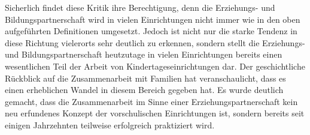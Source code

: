 \documentclass[12pt,a4paper]{article}
\begin{document}
Sicherlich findet diese Kritik ihre Berechtigung, denn die Erziehungs- und Bildungspartnerschaft wird in vielen Einrichtungen nicht immer wie in den oben aufgeführten Definitionen umgesetzt. Jedoch ist nicht nur die starke Tendenz in diese Richtung vielerorts sehr deutlich zu erkennen, sondern stellt die Erziehungs- und Bildungspartnerschaft heutzutage in vielen Einrichtungen bereits einen wesentlichen Teil der Arbeit von Kindertageseinrichtungen dar.
	Der geschichtliche Rückblick auf die Zusammenarbeit mit Familien hat veranschaulicht, dass es einen erheblichen Wandel in diesem Bereich gegeben hat. Es wurde deutlich gemacht, dass die Zusammenarbeit im Sinne einer Erziehungspartnerschaft kein neu erfundenes Konzept der vorschulischen Einrichtungen ist, sondern bereits seit einigen Jahrzehnten teilweise erfolgreich praktiziert wird. 
	
\end{document}
